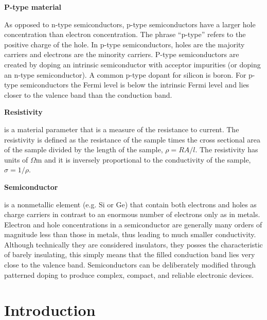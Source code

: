 \documentclass{../lab}
\begin{document}
\textbf{P-type material}

As opposed to n-type semiconductors, p-type semiconductors have a larger hole concentration than electron concentration. The phrase ``p-type'' refers to the positive charge of the hole. In p-type semiconductors, holes are the majority carriers and electrons are the minority carriers. P-type semiconductors are created by doping an intrinsic semiconductor with acceptor impurities (or doping an n-type semiconductor). A common p-type dopant for silicon is boron. For p-type semiconductors the Fermi level is below the intrinsic Fermi level and lies closer to the valence band than the conduction band.

\textbf{Resistivity}

is a material parameter that is a measure of the resistance to current. The resistivity is defined as the resistance of the sample times the cross sectional area of the sample divided by the length of the sample, $\rho = RA/l$. The resistivity has units of $\Omega$m and it is inversely proportional to the conductivity of the sample, $\sigma = 1/\rho$.

\textbf{Semiconductor}

is a nonmetallic element (e.g. Si or Ge) that contain both electrons and holes as charge carriers in contrast to an enormous number of electrons only as in metals. Electron and hole concentrations in a semiconductor are generally many orders of magnitude less than those in metals, thus leading to much smaller conductivity. Although technically they are considered insulators, they posses the characteristic of barely insulating, this simply means that the filled conduction band lies very close to the valence band. Semiconductors can be deliberately modified through patterned doping to produce complex, compact, and reliable electronic devices.


\section{Introduction}
\end{document}
